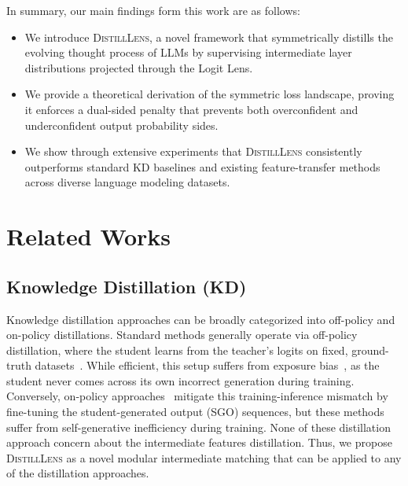 \documentclass{article}
\newcommand{\redtext}[1]{\textcolor{red}{#1}}
\theoremstyle{plain}
\theoremstyle{definition}
\theoremstyle{remark}
\begin{document}
In summary, our main findings form this work are as follows:
\begin{itemize}
    \item We introduce \textsc{DistillLens}, a novel framework that symmetrically distills the evolving thought process of LLMs by supervising intermediate layer distributions projected through the Logit Lens.
    \item We provide a theoretical derivation of the symmetric loss landscape, proving it enforces a dual-sided penalty that prevents both overconfident and underconfident output probability sides.
    \item We show through extensive experiments that \textsc{DistillLens} consistently outperforms standard KD baselines and existing feature-transfer methods across diverse language modeling datasets.
\end{itemize}

\section{Related Works}

\subsection{Knowledge Distillation (KD)}
Knowledge distillation approaches can be broadly categorized into off-policy and on-policy distillations. 
Standard methods generally operate via off-policy distillation, where the student learns from the teacher's logits on fixed, ground-truth datasets~\cite{hinton2015distilling,sanh2019distilbert,wu2024rethinking,kim2016sequence,wen2023f}.
While efficient, this setup suffers from exposure bias~\cite{arora2022exposure}, as the student never comes across its own incorrect generation during training.
Conversely, on-policy approaches~\cite{agarwal2024onpolicy,gu2024minillm,ko2024distillm,kodistillm} mitigate this training-inference mismatch by fine-tuning the student-generated output (SGO) sequences, but these methods suffer from self-generative inefficiency during training.
None of these distillation approach concern about the intermediate features distillation.
Thus, we propose \textsc{DistillLens} as a novel modular intermediate matching that can be applied to any of the distillation approaches.
\end{document}
